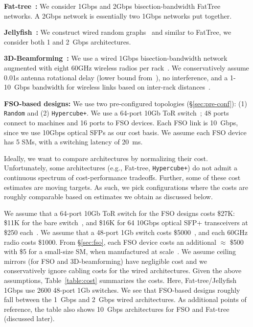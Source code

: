 \begin{packeditemize}
\item {\bf Fat-tree~\cite{fattree}:} We consider
   1Gbps and 2Gbps bisection-bandwidth FatTree networks. A
  2Gbps network is essentially two 1Gbps networks put together.

\item {\bf Jellyfish~\cite{jellyfish}:} We construct wired random
graphs~\cite{jellyfish} and similar to FatTree, we consider both 1 and 2~Gbps
architectures.

\item {\bf 3D-Beamforming~\cite{3db}:} We use a wired 1Gbps
  bisection-bandwidth network augmented with eight 60GHz wireless
  radios per rack~\cite{3db}. We conservatively assume 0.01s antenna
  rotational delay (lower bound from~\cite{3db}), no interference, and
  a 1-10~Gbps bandwidth for wireless links based on inter-rack
  distances~\cite{3db}.

\item {\bf FSO-based designs:} We use two pre-configured topologies
  (\S\ref{sec:pre-conf}): (1) {\tt Random} and (2) {\tt Hypercube+}.
  We use a 64-port 10Gb ToR switch~\cite{64switch}; 48 ports
  connect to machines and 16 ports  to FSO devices.
  Each FSO link is 10~Gbps, since we use 10Gbps optical SFPs as
  our cost basis.  We assume each FSO device has 5 SMs,
  with a switching latency of 20~ms.
\end{packeditemize}

Ideally, we want to compare architectures by normalizing their cost.
Unfortunately, some architectures (e.g., Fat-tree, {\tt Hypercube+})
do not admit a continuous spectrum of cost-performance
tradeoffs. Further, some of these cost estimates are moving targets.
As such, we pick configurations where the costs are roughly comparable
based on estimates we obtain as discussed below.

We assume that a 64-port 10Gb ToR switch for the FSO designs costs
\$27K: \$11K for the bare switch~\cite{64switch}, and \$16K for 64
10Gbps optical SFP+ transceivers at \$250 each~\cite{sfp}. We assume
that a 48-port 1Gb switch costs \$5000~\cite{48-switch-cost}, and each
60GHz radio costs \$1000. From \S\ref{sec:fso}, each FSO device costs
an additional $\approx$ \$500 with \$5 for a small-size SM, when
manufactured at scale~\cite{sm-personal}.  We assume ceiling mirrors
(for FSO and 3D-beamforming) have negligible cost and we
conservatively ignore cabling costs for the wired architectures. Given
the above assumptions, Table~\ref{table:cost} summarizes the costs.
Here, Fat-tree/Jellyfish 1Gbps use  2600 48-port 1Gb switches. We
see that FSO-based designs roughly fall between the 1~Gbps and 2~Gbps
wired architectures. As additional points of reference, the table also
shows 10~Gbps architectures for FSO and Fat-tree (discussed later).

